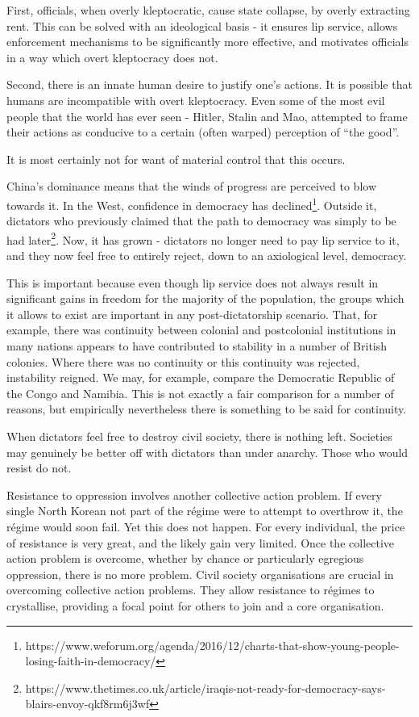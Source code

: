 First, officials, when overly kleptocratic, cause state collapse, by
overly extracting rent. This can be solved with an ideological basis -
it ensures lip service, allows enforcement mechanisms to be
significantly more effective, and motivates officials in a way which
overt kleptocracy does not.

Second, there is an innate human desire to justify one's actions. It is
possible that humans are incompatible with overt kleptocracy. Even some
of the most evil people that the world has ever seen - Hitler, Stalin
and Mao, attempted to frame their actions as conducive to a certain
(often warped) perception of ``the good''.

It is most certainly not for want of material control that this occurs.

China's dominance means that the winds of progress are perceived to blow
towards it. In the West, confidence in democracy has declined\footnote{https://www.weforum.org/agenda/2016/12/charts-that-show-young-people-losing-faith-in-democracy/}.
Outside it, dictators who previously claimed that the path to democracy
was simply to be had later\footnote{https://www.thetimes.co.uk/article/iraqis-not-ready-for-democracy-says-blairs-envoy-qkf8rm6j3wf}.
Now, it has grown - dictators no longer need to pay lip service to it,
and they now feel free to entirely reject, down to an axiological level,
democracy.

This is important because even though lip service does not always result
in significant gains in freedom for the majority of the population, the
groups which it allows to exist are important in any post-dictatorship
scenario. That, for example, there was continuity between colonial and
postcolonial institutions in many nations appears to have contributed to
stability in a number of British colonies. Where there was no continuity
or this continuity was rejected, instability reigned. We may, for
example, compare the Democratic Republic of the Congo and Namibia. This
is not exactly a fair comparison for a number of reasons, but
empirically nevertheless there is something to be said for continuity.

When dictators feel free to destroy civil society, there is nothing
left. Societies may genuinely be better off with dictators than under
anarchy. Those who would resist do not.

Resistance to oppression involves another collective action problem. If
every single North Korean not part of the régime were to attempt to
overthrow it, the régime would soon fail. Yet this does not happen. For
every individual, the price of resistance is very great, and the likely
gain very limited. Once the collective action problem is overcome,
whether by chance or particularly egregious oppression, there is no more
problem. Civil society organisations are crucial in overcoming
collective action problems. They allow resistance to régimes to
crystallise, providing a focal point for others to join and a core
organisation.

